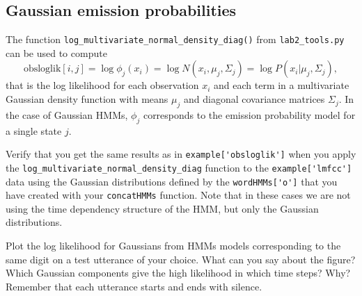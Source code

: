 \documentclass{nada-ten}
\begin{document}
\subsection{Gaussian emission probabilities}
The function \texttt{log\_multivariate\_normal\_density\_diag()} from \texttt{lab2\_tools.py} can be used to compute
$$ \mbox{obsloglik}[i,j] = \log \phi_j(x_i) = \log N(x_i, \mu_j, \Sigma_j) = \log P(x_i|\mu_j,\Sigma_j),$$
that is the log likelihood for each observation $x_i$ and each term in a multivariate Gaussian density function with means $\mu_j$ and diagonal covariance matrices $\Sigma_j$. In the case of Gaussian HMMs, $\phi_j$ corresponds to the emission probability model for a single state $j$. %

Verify that you get the same results as in \verb|example['obsloglik']| %
when you apply the \texttt{log\_multivariate\_normal\_density\_diag} function to the \verb|example['lmfcc']| data using the Gaussian distributions defined by the \verb|wordHMMs['o']| that you have created with your \texttt{concatHMMs} function. Note that in these cases we are not using the time dependency structure of the HMM, but only the Gaussian distributions.

Plot the log likelihood for Gaussians from HMMs models corresponding to the same digit on a test utterance of your choice. What can you say about the figure? Which Gaussian components give the high likelihood in which time steps? Why? Remember that each utterance starts and ends with silence.

\end{document}
